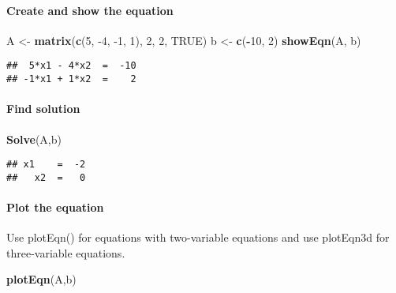 \documentclass[
]{article}
\newenvironment{Shaded}{\begin{snugshade}}{\end{snugshade}}
\newcommand{\DecValTok}[1]{\textcolor[rgb]{0.00,0.00,0.81}{#1}}
\newcommand{\KeywordTok}[1]{\textcolor[rgb]{0.13,0.29,0.53}{\textbf{#1}}}
\newcommand{\NormalTok}[1]{#1}
\newcommand{\OperatorTok}[1]{\textcolor[rgb]{0.81,0.36,0.00}{\textbf{#1}}}
\newcommand{\OtherTok}[1]{\textcolor[rgb]{0.56,0.35,0.01}{#1}}
\newcommand{\StringTok}[1]{\textcolor[rgb]{0.31,0.60,0.02}{#1}}
\begin{document}
\hypertarget{create-and-show-the-equation}{%
\paragraph{Create and show the
equation}\label{create-and-show-the-equation}}

\begin{Shaded}
\begin{Highlighting}[]
\NormalTok{A <-}\StringTok{ }\KeywordTok{matrix}\NormalTok{(}\KeywordTok{c}\NormalTok{(}\DecValTok{5}\NormalTok{, }\DecValTok{-4}\NormalTok{, }\DecValTok{-1}\NormalTok{, }\DecValTok{1}\NormalTok{), }\DecValTok{2}\NormalTok{, }\DecValTok{2}\NormalTok{, }\OtherTok{TRUE}\NormalTok{)}
\NormalTok{b <-}\StringTok{ }\KeywordTok{c}\NormalTok{(}\OperatorTok{-}\DecValTok{10}\NormalTok{, }\DecValTok{2}\NormalTok{)}
\KeywordTok{showEqn}\NormalTok{(A, b)}
\end{Highlighting}
\end{Shaded}

\begin{verbatim}
##  5*x1 - 4*x2  =  -10 
## -1*x1 + 1*x2  =    2
\end{verbatim}

\hypertarget{find-solution}{%
\paragraph{Find solution}\label{find-solution}}

\begin{Shaded}
\begin{Highlighting}[]
\KeywordTok{Solve}\NormalTok{(A,b)}
\end{Highlighting}
\end{Shaded}

\begin{verbatim}
## x1    =  -2 
##   x2  =   0
\end{verbatim}

\hypertarget{plot-the-equation}{%
\paragraph{Plot the equation}\label{plot-the-equation}}

Use plotEqn() for equations with two-variable equations and use
plotEqn3d for three-variable equations.

\begin{Shaded}
\begin{Highlighting}[]
\KeywordTok{plotEqn}\NormalTok{(A,b)}
\end{Highlighting}
\end{Shaded}
\end{document}
